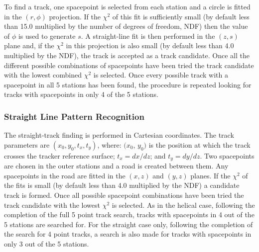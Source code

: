    To find a track, one spacepoint is selected from each station and a circle is fitted in the $(r, \phi)$ projection. If the $\chi^2$ of this fit is sufficiently small (by default less than 15.0 multiplied by the number of degrees of freedom, NDF) then the value of $\phi$ is used to generate $s$. A straight-line fit is then performed in the $(z,s)$ plane and, if the $\chi^2$ in this projection is also small (by default less than 4.0 multiplied by the NDF), the track is accepted as a track candidate. Once all the different possible combinations of spacepoints have been tried the track candidate with the lowest combined $\chi^2$ is selected. Once every possible track with a spacepoint in all 5 stations has been found, the procedure is repeated looking for tracks with spacepoints in only 4 of the 5 stations. %
   

    \subsubsection{Straight Line Pattern Recognition}
    \label{subsubsec:StraightLinePatternRecognition}


    The straight-track finding is performed in Cartesian coordinates. The track parameters are $(x_0, y_0, t_x, t_y)$, where: $(x_0$, $y_0)$ is the position at which the track crosses the tracker reference surface; $t_x = dx/dz$; and $t_y = dy/dz$. Two spacepoints are chosen in the outer stations and a road is created between them. Any spacepoints in the road are fitted in the $(x,z)$ and $(y,z)$ planes. If the $\chi^2$ of the fits is small (by default less than 4.0 multiplied by the NDF) a candidate track is formed. Once all possible spacepoint combinations have been tried the track candidate with the lowest $\chi^2$ is selected. As in the helical case, following the completion of the full 5 point track search, tracks with spacepoints in 4 out of the 5 stations are searched for. For the straight case only, following the completion of the search for 4 point tracks, a search is also made for tracks with spacepoints in only 3 out of the 5 stations. 

